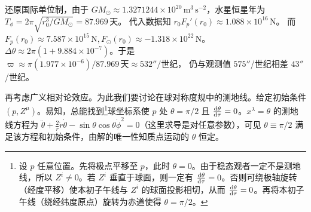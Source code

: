 \begin{table}[htbp]
\centering
\caption{行星数据与计算结果}
\end{table}
还原国际单位制，由于 $GM_\odot\approx 1.3271244\times10^{20}\,\mathrm{m^3\,s^{-2}}$，水星恒星年为 $T_\phi=2\pi\sqrt{{r_0^3}/{GM_\odot}}=87.969\,\text{天}$。
代入数据知 $r_0F_p'(r_0)\approx 1.088 \times 10^{16}\,\mathrm{N}$。
而 $F_p(r_0)\approx 7.587 \times 10^{15}\,\mathrm{N}, F_\odot(r_0)\approx -1.318 \times 10^{22}\,\mathrm{N}$。
$\Delta \theta\approx 2\pi(1+9.884\times 10^{-7})$。于是 $\varpi\approx{\pi(1.977\times 10^{-6})}/{87.969\,\text{天}}\approx 532''/\text{世纪}$，
仍与观测值 $575''$/世纪相差 $43''$/世纪。

再考虑广义相对论效应。为此我们要讨论在球对称度规中的测地线。给定初始条件 $(p,Z^\mu)$。易知，总能找到\footnote{设 $p$ 任意位置。先将极点平移至 $p$，此时 $\theta=0$。由于稳态观者一定不是测地线，所以 $Z^i\ne 0$。若 $Z^i$ 垂直于球面，则一定有 $\dv{\theta}{\tau}=0$。否则可绕极轴旋转（经度平移）使本初子午线与 $Z^i$ 的球面投影相切，从而 $\dv{\theta}{\tau}=0$。再将本初子午线（绕经纬度原点）旋转为赤道使得 $\theta=\pi/2$。}球坐标系使 $p$ 处 $\theta=\pi/2$ 且 $\dv{\theta}{\tau}=0$。$x^\lambda = \theta$ 的测地线方程为 $\ddot\theta+\frac{2}{r}\dot r\dot\theta-\sin\theta\cos\theta\dot\phi^2=0$（这里求导是对任意参数），可见 $\theta\equiv\pi/2$ 满足该方程和初始条件，由解的唯一性知质点运动的 $\theta$ 恒定。

